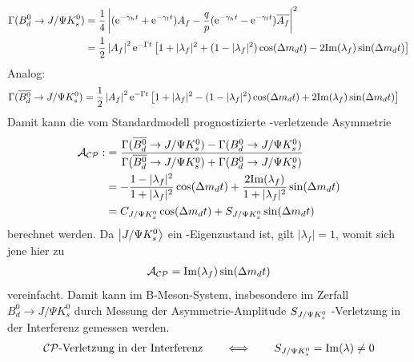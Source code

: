 \begin{align}
\nonumber \Gamma (\text{$B_d^0$} \rightarrow J/\Psi K_s^0) &= \frac{1}{4}\left| (\mathrm{e}^{-\gamma_h t}+\mathrm{e}^{-\gamma_l t})A_f - \frac{q}{p}(\mathrm{e}^{-\gamma_h t}-\mathrm{e}^{-\gamma_l t})\overline{A_f}\right|^2 \\
&= \frac{1}{2} \left|A_f\right|^2\mathrm{e}^{-\Gamma t} \left[1+|\lambda_f|^2 + (1-|\lambda_f|^2)\cos(\Delta m_d t) - 2\mathrm{Im}(\lambda_f)\sin(\Delta m_d t)\right] \label{eq:bd}
\end{align}
Analog:
\begin{align}
\Gamma (\text{$\overline{B_d^0}$} \rightarrow J/\Psi K_s^0) &= \frac{1}{2} \left|A_f\right|^2\mathrm{e}^{-\Gamma t} \left[1+|\lambda_f|^2 -(1-|\lambda_f|^2)\cos(\Delta m_d t) + 2\mathrm{Im}(\lambda_f)\sin(\Delta m_d t)\right] \label{eq:bdbar}
\end{align}
Damit kann die vom Standardmodell prognostizierte \CP-verletzende Asymmetrie 
\begin{align}
\mathcal{A}_{\text{$\mathcal{CP}$}} :&= \frac{\Gamma (\text{$\overline{B_d^0}$} \rightarrow J/\Psi K_s^0) - \Gamma (\text{$B_d^0$} \rightarrow J/\Psi K_s^0)}{\Gamma (\text{$\overline{B_d^0}$} \rightarrow J/\Psi K_s^0) + \Gamma (\text{$B_d^0$} \rightarrow J/\Psi K_s^0)} \label{eq:cp_asymm_def}\\
&= -\frac{1-|\lambda_f|^2}{1+|\lambda_f|^2}\cos(\Delta m_d t) + \frac{2\mathrm{Im}(\lambda_f)}{1+|\lambda_f|^2}\sin(\Delta m_d t) \\
&= C_{J/\Psi K_s^0} \cos(\Delta m_d t) + S_{J/\Psi K_s^0} \sin(\Delta m_d t) \label{eq:cp_asymm}
\end{align}
berechnet werden. Da $\Ket{J/\Psi K_s^0}$ ein \CP-Eigenzustand ist, gilt $|\lambda_f| = 1$, womit sich jene hier zu
\begin{align}
\mathcal{A}_{\text{$\mathcal{CP}$}} = \mathrm{Im}(\lambda_f)\sin(\Delta m_d t)
\end{align}
vereinfacht. Damit kann im B-Meson-System, insbesondere im Zerfall $B_d^0 \rightarrow J/\Psi K_s^0$ durch Messung der Asymmetrie-Amplitude $S_{J/\Psi K_s^0}$ \CP-Verletzung in der Interferenz gemessen werden.
\begin{align}
\text{$\mathcal{CP}$-Verletzung in der Interferenz} \qquad \Longleftrightarrow \qquad S_{J/\Psi K_s^0} = \mathrm{Im}(\lambda)\neq 0
\end{align}

